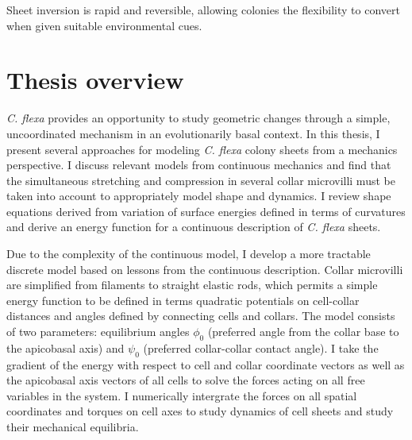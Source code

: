 Sheet inversion is rapid and reversible, allowing colonies the flexibility to convert when given suitable environmental cues.



% 

\section{Thesis overview}

\textit{C. flexa} provides an opportunity to study geometric changes through a simple, uncoordinated mechanism in an evolutionarily basal context. 
In this thesis, I present several approaches for modeling \textit{C. flexa} colony sheets from a mechanics perspective. 
I discuss relevant models from continuous mechanics and find that the simultaneous stretching and compression in several collar microvilli must be taken into account to appropriately model shape and dynamics. 
I review shape equations derived from variation of surface energies defined in terms of curvatures and derive an energy function for a continuous description of \textit{C. flexa} sheets. 

Due to the complexity of the continuous model, I develop a more tractable discrete model based on lessons from the continuous description. 
Collar microvilli are simplified from filaments to straight elastic rods, which permits a simple energy function to be defined in terms quadratic potentials on cell-collar distances and angles defined by connecting cells and collars.
The model consists of two parameters: equilibrium angles $\phi_0$ (preferred angle from the collar base to the apicobasal axis) and $\psi_0$ (preferred collar-collar contact angle). 
I take the gradient of the energy with respect to cell and collar coordinate vectors as well as the apicobasal axis vectors of all cells to solve the forces acting on all free variables in the system.
I numerically intergrate the forces on all spatial coordinates and torques on cell axes to study dynamics of cell sheets and study their mechanical equilibria.

